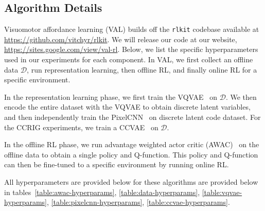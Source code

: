 \subsection{Algorithm Details}

Visuomotor affordance learning (VAL) builds off the \texttt{rlkit} codebase available at \url{https://github.com/vitchyr/rlkit}. We will release our code at our website, \url{https://sites.google.com/view/val-rl}. Below, we list the specific hyperparameters used in our experiments for each component. In VAL, we first collect an offline data $\mathcal{D}$, run representation learning, then offline RL, and finally online RL for a specific environment.

In the representation learning phase, we first train the VQVAE~\cite{oord2017vqvae} on $\mathcal{D}$. We then encode the entire dataset with the VQVAE to obtain discrete latent variables, and then independently train the PixelCNN~\cite{oord2016pixelcnn} on discrete latent code dataset. For the CCRIG experiments, we train a CCVAE~\cite{sohn2015cvae} on $\mathcal{D}$.

In the offline RL phase, we run advantage weighted actor critic (AWAC)~\cite{nair2020awac} on the offline data to obtain a single policy and Q-function. This policy and Q-function can then be fine-tuned to a specific environment by running online RL. 

All hyperparameters are provided below for these algorithms are provided below in tables~\ref{table:awac-hyperparams}, \ref{table:data-hyperparams}, \ref{table:vqvae-hyperparams}, \ref{table:pixelcnn-hyperparams}, \ref{table:ccvae-hyperparams}.

